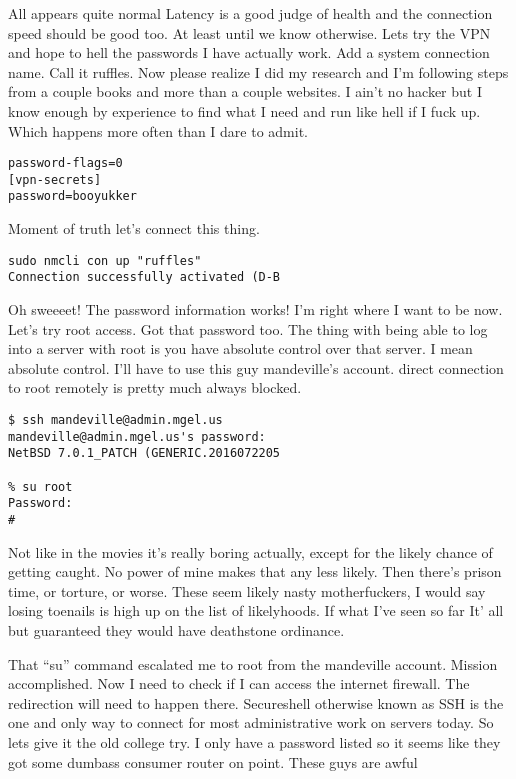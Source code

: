 All appears quite normal Latency is a good judge of health and the connection speed should be good too. At least until we know otherwise. Lets try the VPN and hope to hell the passwords I have actually work. Add a system connection name. Call it ruffles. Now please realize I did my research and I'm following steps from a couple books and more than a couple websites. I ain't no hacker but I know enough by experience to find what I need and run like hell if I fuck up. Which happens more often than I dare to admit.

\begin{verbatim}
password-flags=0
[vpn-secrets]
password=booyukker
\end{verbatim}
\medskip

Moment of truth let's connect this thing.

\begin{verbatim}
sudo nmcli con up "ruffles"
Connection successfully activated (D-B
\end{verbatim}
\medskip

Oh sweeeet! The password information works! I'm right where I want to be now. Let's try root access. Got that password too. The thing with being able to log into a server with root is you have absolute control over that server. I mean absolute control. I'll have to use this guy mandeville's account. direct connection to root remotely is pretty much always blocked.

\begin{verbatim}
$ ssh mandeville@admin.mgel.us
mandeville@admin.mgel.us's password: 
NetBSD 7.0.1_PATCH (GENERIC.2016072205

% su root
Password:
# 
\end{verbatim}
\medskip

Not like in the movies it's really boring actually, except for the likely chance of getting caught. No power of mine makes that any less likely. Then there's prison time, or torture, or worse. These seem likely nasty motherfuckers, I would say losing toenails is high up on the list of likelyhoods. If what I've seen so far It' all but guaranteed they would have deathstone ordinance.

That ``su'' command escalated me to root from the mandeville account. Mission accomplished. Now I need to check if I can access the internet firewall. The redirection will need to happen there. Secureshell otherwise known as SSH is the one and only way to connect for most administrative work on servers today. So lets give it the old college try. I only have a password listed so it seems like they got some dumbass consumer router on point. These guys are awful

